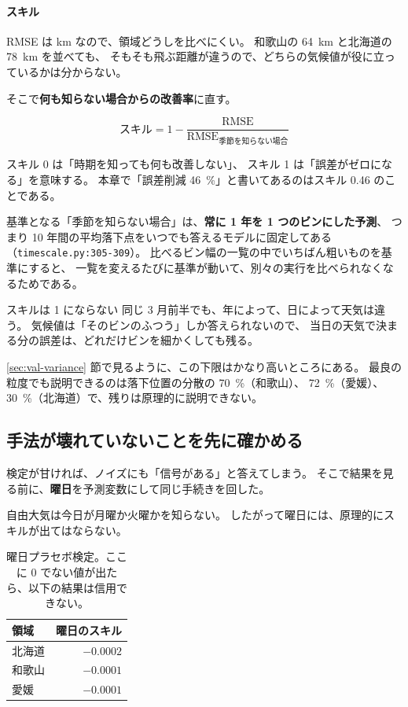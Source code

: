 \paragraph{スキル}
RMSE は \si{\kilo\metre} なので、領域どうしを比べにくい。
和歌山の \SI{64}{\kilo\metre} と北海道の \SI{78}{\kilo\metre} を並べても、
そもそも飛ぶ距離が違うので、どちらの気候値が役に立っているかは分からない。

そこで\textbf{何も知らない場合からの改善率}に直す。

\begin{equation}
\text{スキル} = 1 - \frac{\mathrm{RMSE}}{\mathrm{RMSE}_{\text{季節を知らない場合}}}
\label{eq:skill}
\end{equation}

スキル 0 は「時期を知っても何も改善しない」、
スキル 1 は「誤差がゼロになる」を意味する。
本章で「誤差削減 \SI{46}{\percent}」と書いてあるのはスキル \num{0.46} のことである。

基準となる「季節を知らない場合」は、\textbf{常に 1 年を 1 つのビンにした予測}、
つまり 10 年間の平均落下点をいつでも答えるモデルに固定してある
（\texttt{timescale.py:305-309}）。
比べるビン幅の一覧の中でいちばん粗いものを基準にすると、
一覧を変えるたびに基準が動いて、別々の実行を比べられなくなるためである。

\begin{whybox}{スキルは 1 にならない}
同じ 3 月前半でも、年によって、日によって天気は違う。
気候値は「そのビンのふつう」しか答えられないので、
当日の天気で決まる分の誤差は、どれだけビンを細かくしても残る。

\ref{sec:val-variance} 節で見るように、この下限はかなり高いところにある。
最良の粒度でも説明できるのは落下位置の分散の \SI{70}{\percent}（和歌山）、
\SI{72}{\percent}（愛媛）、\SI{30}{\percent}（北海道）で、残りは原理的に説明できない。
\end{whybox}

\subsection{手法が壊れていないことを先に確かめる}
\label{sec:val-placebo}

検定が甘ければ、ノイズにも「信号がある」と答えてしまう。
そこで結果を見る前に、\textbf{曜日}を予測変数にして同じ手続きを回した。

自由大気は今日が月曜か火曜かを知らない。
したがって曜日には、原理的にスキルが出てはならない。

\begin{table}[H]
\centering
\caption{曜日プラセボ検定。ここに 0 でない値が出たら、以下の結果は信用できない。}
\begin{tabular}{lr}
\toprule
領域 & 曜日のスキル \\
\midrule
北海道 & $-0.0002$ \\
和歌山 & $-0.0001$ \\
愛媛 & $-0.0001$ \\
\bottomrule
\end{tabular}
\end{table}

